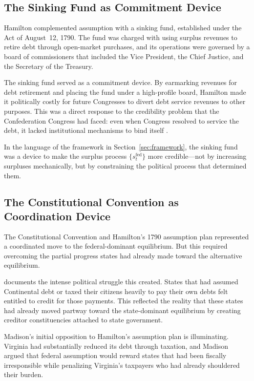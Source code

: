 \documentclass[12pt]{article}
\begin{document}
\subsection{The Sinking Fund as Commitment Device}
\label{sec:sinking}

Hamilton complemented assumption with a sinking fund, established under
the Act of August~12, 1790. The fund was charged with using surplus
revenues to retire debt through open-market purchases, and its
operations were governed by a board of commissioners that included the
Vice President, the Chief Justice, and the Secretary of the Treasury.

The sinking fund served as a commitment device. By earmarking revenues
for debt retirement and placing the fund under a high-profile board,
Hamilton made it politically costly for future Congresses to divert debt
service revenues to other purposes. This was a direct response to the
credibility problem that the Confederation Congress had faced: even when
Congress resolved to service the debt, it lacked institutional mechanisms
to bind itself \citep[pp.~220--225]{Ferguson1961}.

In the language of the framework in Section~\ref{sec:framework}, the
sinking fund was a device to make the surplus process
$\{s_t^{\text{fed}}\}$ more credible---not by increasing surpluses
mechanically, but by constraining the political process that determined
them.

\subsection{The Constitutional Convention as Coordination Device}

The Constitutional Convention and Hamilton's 1790 assumption plan
represented a coordinated move to the federal-dominant equilibrium. But
this required overcoming the partial progress states had already made
toward the alternative equilibrium.

\citet[pp.~289--291]{Ferguson1961} documents the intense political
struggle this created. States that had assumed Continental debt or taxed
their citizens heavily to pay their own debts felt entitled to credit for
those payments. This reflected the reality that these states had already
moved partway toward the state-dominant equilibrium by creating creditor
constituencies attached to state government.

Madison's initial opposition to Hamilton's assumption plan is
illuminating. Virginia had substantially reduced its debt through
taxation, and Madison argued that federal assumption would reward states
that had been fiscally irresponsible while penalizing Virginia's
taxpayers who had already shouldered their burden.
\end{document}
